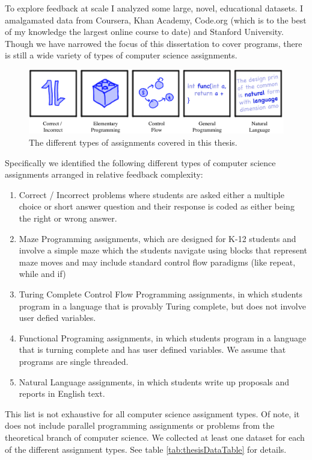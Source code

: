 To explore feedback at scale I analyzed some large, novel, educational
datasets. I amalgamated data from Coursera, Khan Academy, Code.org (which is to the
best of my knowledge the largest online course to date) and Stanford University. Though we have narrowed the focus of this dissertation to cover programs, there is still a wide variety of types of computer science assignments. 

\begin{figure}[h]
\center
\includegraphics[width=1.0\textwidth]{img/assnType_all}
\caption[Assignment types]{
The different types of assignments covered in this thesis.
\label{fig:assnTypes}
}
\end{figure}

Specifically we identified the following different types of computer science assignments arranged in relative feedback complexity: 
\begin{enumerate}
\item Correct / Incorrect problems where students are asked either a multiple choice or short answer question and their response is coded as either being the right or wrong answer. 
\item Maze Programming assignments, which are designed for K-12 students and involve a simple maze which the students navigate using blocks that represent maze moves and may include standard control flow paradigms (like repeat, while and if)
\item Turing Complete Control Flow Programming assignments, in which students program in a language that is provably Turing complete, but does not involve user defied variables.
\item Functional Programing assignments, in which students program in a language that is turning complete and has user defined variables. We assume that programs are single threaded.
\item Natural Language assignments, in which students write up proposals and reports in English text.	
\end{enumerate}

This list is not exhaustive for all computer science assignment types. Of note, it does not include parallel programming assignments or problems from the theoretical branch of computer science. We collected at least one dataset for each of the different assignment types. See table \ref{tab:thesisDataTable} for details. 

